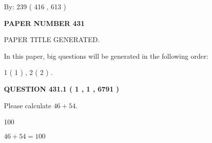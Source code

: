 \documentclass[12pt]{article}
\begin{document}
   
\hspace{1.0in} By: 
 239 ( 416 ,  613 )
   
   
   
   
\newpage 
\setcounter{page}{ 
   431001 } 
   
   
   
   
 {\textbf{ \Large{ PAPER NUMBER  431  }}}
   
   
\vspace{0.2in}
   
   
   
   
   
   
   
   
 \vspace{0.2in}
 
 
 
 
   
   
 PAPER TITLE GENERATED.
   
   
   
\vspace{0.2in}
   
In this paper, big questions will be generated in the following order: 
   
   
   1 ( 1 )
 ,
   2 ( 2 )
 .
  
\vspace{0.2in}
  
{\textbf{\Large{QUESTION
431.1 
 ( 1 , 1 , 6791 )
}}}
  
  
 
Please calculate $ %
46 +  %
54 $.
 
 
 
\noindent{}
 
 

100
 
 
\noindent{}
 
 

 
 
 
\noindent{}
 
 

$ %
46 +  %
54=   %
100$
 
 
\noindent{}
 
\end{document}
